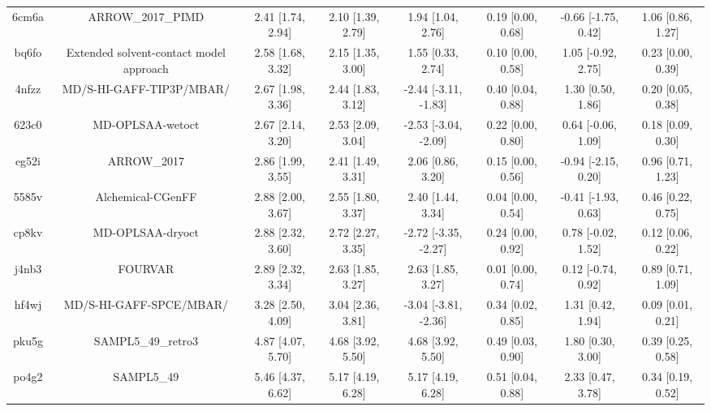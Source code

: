 \documentclass{article}
\begin{document}
\begin{center}
\begin{longtable}{|cccccccc|}
 6cm6a &                                  ARROW\_2017\_PIMD &  2.41 [1.74, 2.94] &  2.10 [1.39, 2.79] &     1.94 [1.04, 2.76] &  0.19 [0.00, 0.68] &  -0.66 [-1.75, 0.42] &     1.06 [0.86, 1.27] \\
 bq6fo &            Extended solvent-contact model approach &  2.58 [1.68, 3.32] &  2.15 [1.35, 3.00] &     1.55 [0.33, 2.74] &  0.10 [0.00, 0.58] &   1.05 [-0.92, 2.75] &     0.23 [0.00, 0.39] \\
 4nfzz &                           MD/S-HI-GAFF-TIP3P/MBAR/ &  2.67 [1.98, 3.36] &  2.44 [1.83, 3.12] &  -2.44 [-3.11, -1.83] &  0.40 [0.04, 0.88] &    1.30 [0.50, 1.86] &     0.20 [0.05, 0.38] \\
 623c0 &                                   MD-OPLSAA-wetoct &  2.67 [2.14, 3.20] &  2.53 [2.09, 3.04] &  -2.53 [-3.04, -2.09] &  0.22 [0.00, 0.80] &   0.64 [-0.06, 1.09] &     0.18 [0.09, 0.30] \\
 eg52i &                                        ARROW\_2017 &  2.86 [1.99, 3.55] &  2.41 [1.49, 3.31] &     2.06 [0.86, 3.20] &  0.15 [0.00, 0.56] &  -0.94 [-2.15, 0.20] &     0.96 [0.71, 1.23] \\
 5585v &                                  Alchemical-CGenFF &  2.88 [2.00, 3.67] &  2.55 [1.80, 3.37] &     2.40 [1.44, 3.34] &  0.04 [0.00, 0.54] &  -0.41 [-1.93, 0.63] &     0.46 [0.22, 0.75] \\
 cp8kv &                                   MD-OPLSAA-dryoct &  2.88 [2.32, 3.60] &  2.72 [2.27, 3.35] &  -2.72 [-3.35, -2.27] &  0.24 [0.00, 0.92] &   0.78 [-0.02, 1.52] &     0.12 [0.06, 0.22] \\
 j4nb3 &                                            FOURVAR &  2.89 [2.32, 3.34] &  2.63 [1.85, 3.27] &     2.63 [1.85, 3.27] &  0.01 [0.00, 0.74] &   0.12 [-0.74, 0.92] &     0.89 [0.71, 1.09] \\
 hf4wj &                            MD/S-HI-GAFF-SPCE/MBAR/ &  3.28 [2.50, 4.09] &  3.04 [2.36, 3.81] &  -3.04 [-3.81, -2.36] &  0.34 [0.02, 0.85] &    1.31 [0.42, 1.94] &     0.09 [0.01, 0.21] \\
 pku5g &                                 SAMPL5\_49\_retro3 &  4.87 [4.07, 5.70] &  4.68 [3.92, 5.50] &     4.68 [3.92, 5.50] &  0.49 [0.03, 0.90] &    1.80 [0.30, 3.00] &     0.39 [0.25, 0.58] \\
 po4g2 &                                         SAMPL5\_49 &  5.46 [4.37, 6.62] &  5.17 [4.19, 6.28] &     5.17 [4.19, 6.28] &  0.51 [0.04, 0.88] &    2.33 [0.47, 3.78] &     0.34 [0.19, 0.52] \\
\end{longtable}
\end{center}
\end{document}
